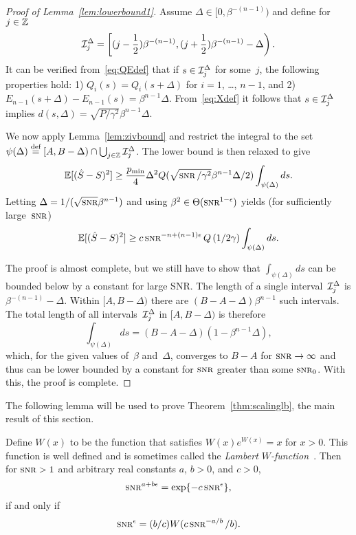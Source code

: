 \begin{proof}[Proof of Lemma~\ref{lem:lowerbound1}]
  Assume $\Delta \in [0, \beta^{-(n-1)})$ and define for $j \in \mathbb{Z}$
  \[ \mathcal{I}_j^\Delta = \left[ (j - \frac12 )\beta^{-(n-1)}, 
    (j + \frac12 ) \beta^{-(n-1)} - \Delta \right).\]
  It can be verified from~\eqref{eq:QEdef} that if $s \in \mathcal{I}_j^\Delta$ for
  some~$j$, the following properties hold: 1) $Q_i(s) = Q_i(s+\Delta)$ for
  $i=1$, \dots, $n-1$, and 2) $E_{n-1}(s+\Delta) - E_{n-1}(s) =
  \beta^{n-1}\Delta$.  From~\eqref{eq:Xdef} it follows that
  $s \in \mathcal{I}_j^\Delta$ implies $d(s, \Delta) = \sqrt{P/\gamma^2} \beta^{n-1}\Delta$.

  We now apply Lemma~\ref{lem:zivbound} and restrict the integral to the
  set~$\psi(\Delta) \stackrel{\text{def}}{=} [A,B-\Delta) \cap \bigcup_{j\in\mathbb{Z}} \mathcal{I}_j^\Delta$. The
  lower bound is then relaxed to give
  \begin{equation*}
    \mse \ge \frac{\pmin}{4} \Delta^2 Q(\sqrt{\snr/\gamma^2} \beta^{n-1}
    \Delta/2) \int_{\psi(\Delta)} ds.
  \end{equation*}
  Letting $\Delta = 1/(\sqrt{\snr}\beta^{n-1})$ and using $\beta^2 \in
  \Theta(\snr^{1-\e})$ yields (for sufficiently large~$\snr$)
  \begin{equation*}
    \mse \ge c \snr^{-n+(n-1)\e} Q\left(1/2\gamma\right)
    \int_{\psi(\Delta)} ds.
  \end{equation*}

  The proof is almost complete, but we still have to show that
  $\int_{\psi(\Delta)}ds$ can be bounded below by a constant for large SNR. The
  length of a single interval~$\mathcal{I}_j^\Delta$ is $\beta^{-(n-1)} - \Delta$. Within
  $[A,B-\Delta)$ there are $(B-A-\Delta)\beta^{n-1}$ such
  intervals. The total length of all intervals~$\mathcal{I}_j^\Delta$ in $[A, B-\Delta)$
  is therefore
  \[ \int_{\psi(\Delta)} ds = (B-A-\Delta)
  (1 - \beta^{n-1}\Delta), \]
  which, for the given values of~$\beta$ and~$\Delta$, 
  converges to $B-A$ for $\snr \ra \infty$ and thus can be lower bounded by a
  constant for $\snr$ greater than some $\snr_0$. With this, the proof is
  complete.
\end{proof}

The following lemma will be used to prove Theorem~\ref{thm:scalinglb}, the main
result of this section.

\begin{lemma}
  \label{lem:epssolution}
  Define $W(x)$ to be the function that satisfies $W(x)e^{W(x)} = x$ for $x >
  0$.  This function is well defined and is sometimes called the \emph{Lambert
  $W$-function}~\textnormal{\cite{CorlessGHJK1996}}. Then for $\snr > 1$ and
  arbitrary real constants $a$, $b>0$, and $c > 0$, 
  \begin{equation}
    \label{eq:epsequation}
    \snr^{a+b\e} = \exp\{-c\snr^\e\},
  \end{equation}
  if and only if
  \begin{equation}
    \label{eq:epssolution}
    \snr^\e = (b/c) W(c\snr^{-a/b} / b).
  \end{equation}
\end{lemma}

